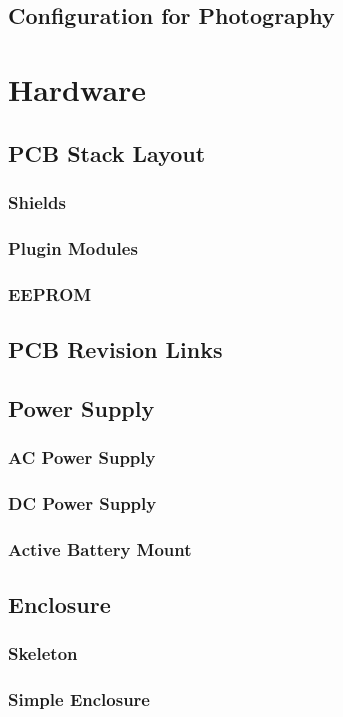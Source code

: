 \documentclass{article}
\begin{document}
\subsection{Configuration for Photography}

\section{Hardware}
\subsection{PCB Stack Layout}
\subsubsection{Shields}
\subsubsection{Plugin Modules}
\subsubsection{EEPROM}
\subsection{PCB Revision Links}
\subsection{Power Supply}
\subsubsection{AC Power Supply}
\subsubsection{DC Power Supply}
\subsubsection{Active Battery Mount}
\subsection{Enclosure}
\subsubsection{Skeleton}
\subsubsection{Simple Enclosure}
\end{document}
